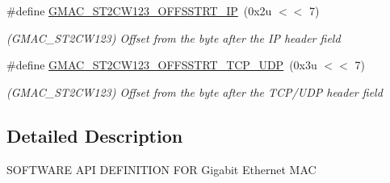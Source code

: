 \begin{DoxyCompactItemize}
\mbox{\label{group__SAMV71__GMAC_gac539682c8479eea05827ceba291014bb}} 
\#define \mbox{\hyperlink{group__SAMV71__GMAC_gac539682c8479eea05827ceba291014bb}{G\+M\+A\+C\+\_\+\+S\+T2\+C\+W123\+\_\+\+O\+F\+F\+S\+S\+T\+R\+T\+\_\+\+IP}}~(0x2u $<$$<$ 7)
\begin{DoxyCompactList}\small\item\em (G\+M\+A\+C\+\_\+\+S\+T2\+C\+W123) Offset from the byte after the IP header field \end{DoxyCompactList}\item 
\mbox{\label{group__SAMV71__GMAC_ga9eb6018cea2ec9165bd53bdb6e7c1398}} 
\#define \mbox{\hyperlink{group__SAMV71__GMAC_ga9eb6018cea2ec9165bd53bdb6e7c1398}{G\+M\+A\+C\+\_\+\+S\+T2\+C\+W123\+\_\+\+O\+F\+F\+S\+S\+T\+R\+T\+\_\+\+T\+C\+P\+\_\+\+U\+DP}}~(0x3u $<$$<$ 7)
\begin{DoxyCompactList}\small\item\em (G\+M\+A\+C\+\_\+\+S\+T2\+C\+W123) Offset from the byte after the T\+C\+P/\+U\+DP header field \end{DoxyCompactList}\end{DoxyCompactItemize}


\subsection{Detailed Description}
S\+O\+F\+T\+W\+A\+RE A\+PI D\+E\+F\+I\+N\+I\+T\+I\+ON F\+OR Gigabit Ethernet M\+AC 